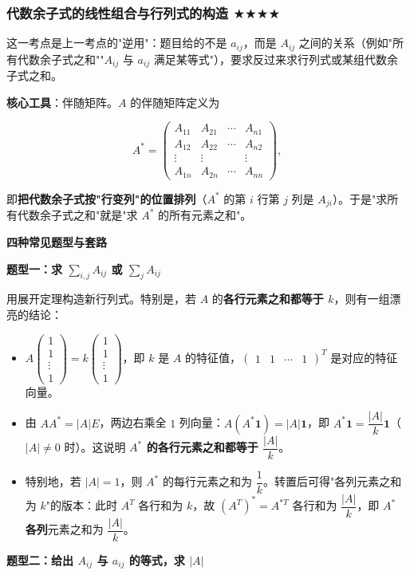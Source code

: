 \documentclass[11pt,openany,UTF8]{ctexbook}
\begin{document}
\subsubsection{代数余子式的线性组合与行列式的构造 $\bigstar$$\bigstar$$\bigstar$$\bigstar$}

这一考点是上一考点的"逆用"：题目给的不是 $a_{ij}$，而是 $A_{ij}$ 之间的关系（例如"所有代数余子式之和""$A_{ij}$ 与 $a_{ij}$ 满足某等式"），要求反过来求行列式或某组代数余子式之和。

\textbf{核心工具}：伴随矩阵。$A$ 的伴随矩阵定义为

\[A^*=\begin{pmatrix}A_{11}&A_{21}&\cdots&A_{n1}\\A_{12}&A_{22}&\cdots&A_{n2}\\\vdots&\vdots&&\vdots\\A_{1n}&A_{2n}&\cdots&A_{nn}\end{pmatrix},\]

即\textbf{把代数余子式按"行变列"的位置排列}（$A^*$ 的第 $i$ 行第 $j$ 列是 $A_{ji}$）。于是"求所有代数余子式之和"就是"求 $A^*$ 的所有元素之和"。

\textbf{四种常见题型与套路}

\textbf{题型一：求 $\sum_{i,j}A_{ij}$ 或 $\sum_j A_{ij}$}

用展开定理构造新行列式。特别是，若 $A$ 的\textbf{各行元素之和都等于 $k$}，则有一组漂亮的结论：

\begin{itemize}
\item $A\begin{pmatrix}1\\1\\\vdots\\1\end{pmatrix}=k\begin{pmatrix}1\\1\\\vdots\\1\end{pmatrix}$，即 $k$ 是 $A$ 的特征值，$\begin{pmatrix}1&1&\cdots&1\end{pmatrix}^T$ 是对应的特征向量。
\item 由 $AA^*=\vert A\vert E$，两边右乘全 $1$ 列向量：$A(A^*\mathbf{1})=\vert A\vert\mathbf{1}$，即 $A^*\mathbf{1}=\dfrac{\vert A\vert}{k}\mathbf{1}$（$\vert A\vert\ne0$ 时）。这说明 \textbf{$A^*$ 的各行元素之和都等于 $\dfrac{\vert A\vert}{k}$}。
\item 特别地，若 $\vert A\vert=1$，则 $A^*$ 的每行元素之和为 $\dfrac{1}{k}$。转置后可得"各列元素之和为 $k$"的版本：此时 $A^T$ 各行和为 $k$，故 $(A^T)^*=A^{*T}$ 各行和为 $\dfrac{\vert A\vert}{k}$，即 $A^*$ \textbf{各列}元素之和为 $\dfrac{\vert A\vert}{k}$。
\end{itemize}
\textbf{题型二：给出 $A_{ij}$ 与 $a_{ij}$ 的等式，求 $\vert A\vert$}
\end{document}
